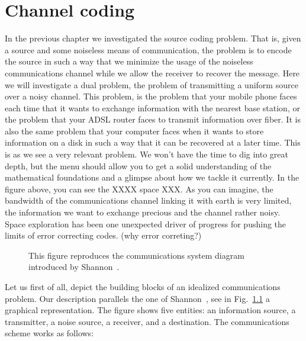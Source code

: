 \usechapterimagetrue
{} %
\chapter{Channel coding}
\usechapterimagefalse

In the previous chapter we investigated the source coding problem. That is, given a source and some noiseless means of communication, the problem is to encode the source in such a way that we minimize the usage of the noiseless communications channel while we allow the receiver to recover the message. Here we will investigate a dual problem, the problem of transmitting a uniform source over a noisy channel. This problem, is the problem that your mobile phone faces each time that it wants to exchange information with the nearest base station, or the problem that your ADSL router faces to transmit information over fiber. It is also the same problem that your computer faces when it wants to store information on a disk in such a way that it can be recovered at a later time. This is as we see a very relevant problem. We won't have the time to dig into great depth, but the menu should allow you to get a solid understanding of the mathematical foundations and a glimpse about how we tackle it currently. In the figure above, you can see the XXXX space XXX. As you can imagine, the bandwidth of the communications channel linking it with earth is very limited, the information we want to exchange precious and the channel rather noisy. Space exploration has been one unexpected driver of progress for pushing the limits of error correcting codes. (why error correting?)
\label{sec:comprob}
\begin{figure}[h!]
\begin{center}
\def\svgwidth{\columnwidth} 

\end{center}
\caption[Communications system diagram.]{This figure reproduces the communications system diagram introduced by Shannon~\cite{Shannon_48}.}
\label{fig:shannoncom}
\end{figure}
Let us first of all, depict the building blocks of an idealized communications problem. Our description parallels the one of Shannon~\cite{Shannon_48}, see in Fig.~\ref{fig:shannoncom} a graphical representation. The figure shows five entities: an information source, a transmitter, a noise source, a receiver, and a destination. The communications scheme works as follows: 

